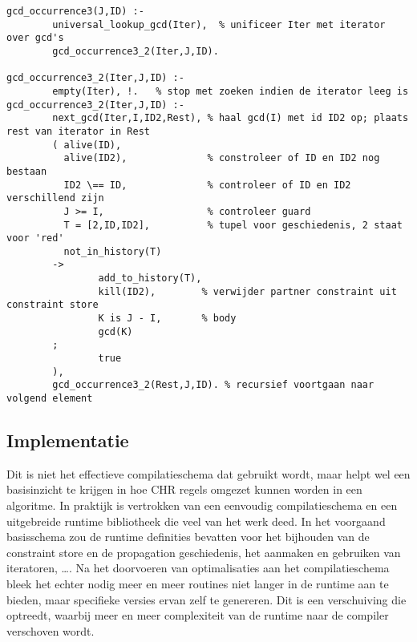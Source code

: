 {\scriptsize \begin{Verbatim}[frame=single]
gcd_occurrence3(J,ID) :-
        universal_lookup_gcd(Iter),  % unificeer Iter met iterator over gcd's
        gcd_occurrence3_2(Iter,J,ID).

gcd_occurrence3_2(Iter,J,ID) :-
        empty(Iter), !.   % stop met zoeken indien de iterator leeg is
gcd_occurrence3_2(Iter,J,ID) :-
        next_gcd(Iter,I,ID2,Rest), % haal gcd(I) met id ID2 op; plaats rest van iterator in Rest
        ( alive(ID),
          alive(ID2),              % constroleer of ID en ID2 nog bestaan
          ID2 \== ID,              % controleer of ID en ID2 verschillend zijn
          J >= I,                  % controleer guard
          T = [2,ID,ID2],          % tupel voor geschiedenis, 2 staat voor 'red'
          not_in_history(T)
        ->
                add_to_history(T),
                kill(ID2),        % verwijder partner constraint uit constraint store
                K is J - I,       % body
                gcd(K)
        ;
                true
        ),
        gcd_occurrence3_2(Rest,J,ID). % recursief voortgaan naar volgend element
\end{Verbatim}
}

\subsection{Implementatie}

Dit is niet het effectieve compilatieschema dat gebruikt wordt, maar helpt wel een basisinzicht te krijgen in hoe CHR regels omgezet kunnen worden in een algoritme. In praktijk is vertrokken van een eenvoudig compilatieschema en een uitgebreide runtime bibliotheek die veel van het werk deed. In het voorgaand basisschema zou de runtime definities bevatten voor het bijhouden van de constraint store en de propagation geschiedenis, het aanmaken en gebruiken van iteratoren, \ldots. Na het doorvoeren van optimalisaties aan het compilatieschema bleek het echter nodig meer en meer routines niet langer in de runtime aan te bieden, maar specifieke versies ervan zelf te genereren. Dit is een verschuiving die optreedt, waarbij meer en meer complexiteit van de runtime naar de compiler verschoven wordt.
